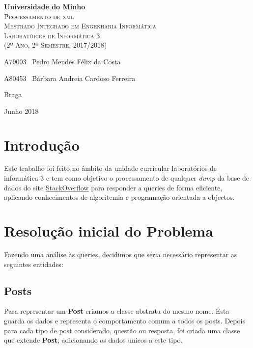 \documentclass[10pt,a4paper]{report}
\begin{document}
\begin{titlepage}
    \center
    {\huge {\bf Universidade do Minho}}\\[0.4cm]
    \vspace{3.0cm}
    \textsc{\huge{Processamento de xml}}\\[0.5cm]
    \vspace{3.0cm}
    \textsc{\huge{Mestrado Integrado em Engenharia Informática}}\\[0.5cm]
    \vspace{2.0cm}
    \textsc{Laboratórios de Informática 3}\\[0.5cm]
    \textsc{(2º Ano, 2º Semestre, 2017/2018)}\\[0.5cm]
    \vspace{1.5cm}
    \begin{flushleft}
        A79003 \,\,\,Pedro Mendes Félix da Costa
        \vspace{0.2cm}

        A80453 \,\,\,Bárbara Andreia Cardoso Ferreira
    \end{flushleft}
        \vspace{1cm}
    \begin{flushright}
        Braga

        Junho 2018
    \end{flushright}

\end{titlepage}

\tableofcontents
\clearpage

\chapter{Introdução}
    Este trabalho foi feito no âmbito da unidade curricular laboratórios de
    informática 3 e tem como objetivo o processamento de qualquer \textit{dump}
    da base de dados do site \href{www.stackoverflow.com}{StackOverflow} para
    responder a queries de forma eficiente, aplicando conhecimentos de
    algoritemia e programação orientada a objectos.

\chapter{Resolução inicial do Problema}
    Fazendo uma análise às queries, decidimos que seria necessário representar
    as seguintes entidades:

    \section{Posts}
        Para representar um \textbf{Post} criamos a classe abstrata
        do mesmo nome. Esta guarda os dados e representa o comportamento comum a
        todos os posts. Depois para cada tipo de post considerado, questão ou
        resposta, foi criada uma classe que extende \textbf{Post}, adicionando
        os dados unicos a este tipo.
\end{document}
